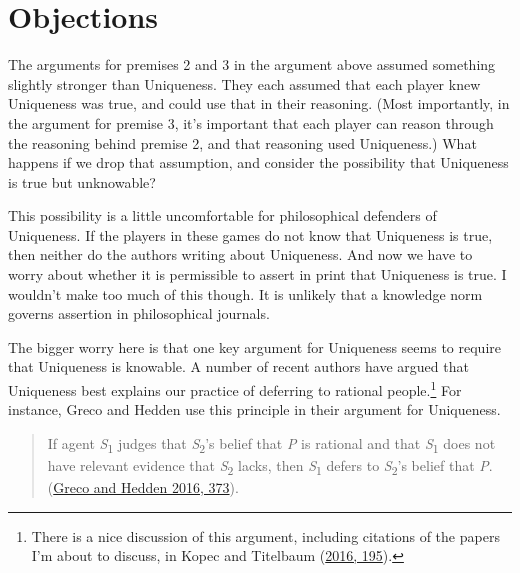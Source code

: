 \documentclass[
  12pt,
  letterpaper,
  DIV=11,
  numbers=noendperiod]{scrreprt}
\begin{document}
\hypertarget{objections}{%
\section{Objections}\label{objections}}

The arguments for premises 2 and 3 in the argument above assumed
something slightly stronger than Uniqueness. They each assumed that each
player knew Uniqueness was true, and could use that in their reasoning.
(Most importantly, in the argument for premise 3, it's important that
each player can reason through the reasoning behind premise 2, and that
reasoning used Uniqueness.) What happens if we drop that assumption, and
consider the possibility that Uniqueness is true but unknowable?

This possibility is a little uncomfortable for philosophical defenders
of Uniqueness. If the players in these games do not know that Uniqueness
is true, then neither do the authors writing about Uniqueness. And now
we have to worry about whether it is permissible to assert in print that
Uniqueness is true. I wouldn't make too much of this though. It is
unlikely that a knowledge norm governs assertion in philosophical
journals.

The bigger worry here is that one key argument for Uniqueness seems to
require that Uniqueness is knowable. A number of recent authors have
argued that Uniqueness best explains our practice of deferring to
rational people.\footnote{There is a nice discussion of this argument,
  including citations of the papers I'm about to discuss, in Kopec and
  Titelbaum (\protect\hyperlink{ref-KopecTitelbaum2016}{2016, 195}).}
For instance, Greco and Hedden use this principle in their argument for
Uniqueness.

\begin{quote}
If agent \emph{S}\textsubscript{1} judges that
\emph{S}\textsubscript{2}'s belief that \emph{P} is rational and that
\emph{S}\textsubscript{1} does not have relevant evidence that
\emph{S}\textsubscript{2} lacks, then \emph{S}\textsubscript{1} defers
to \emph{S}\textsubscript{2}'s belief that \emph{P}.
(\protect\hyperlink{ref-GrecoHedden2016}{Greco and Hedden 2016, 373}).
\end{quote}
\end{document}
